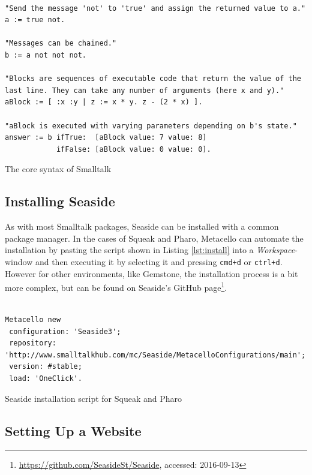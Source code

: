 \documentclass[a4paper,12pt,pagesize,headsepline,oribibl,titlepage]{scrartcl}
\begin{document}
\begin{listing}[]%
\begin{verbatim}

"Send the message 'not' to 'true' and assign the returned value to a."
a := true not.

"Messages can be chained."
b := a not not not.

"Blocks are sequences of executable code that return the value of the 
last line. They can take any number of arguments (here x and y)."
aBlock := [ :x :y | z := x * y. z - (2 * x) ].

"aBlock is executed with varying parameters depending on b's state."
answer := b ifTrue:  [aBlock value: 7 value: 8] 
            ifFalse: [aBlock value: 0 value: 0].

\end{verbatim}
\caption{The core syntax of Smalltalk}
\label{lst:smalltalksyntax}
\end{listing}

\subsection{Installing Seaside}

As with most Smalltalk packages, Seaside can be installed with a common package manager. In the cases of Squeak and Pharo, Metacello can automate the installation by pasting the script shown in Listing \ref{lst:install} into a \emph{Workspace}-window and then executing it by selecting it and pressing \texttt{cmd+d} or \texttt{ctrl+d}. However for other environments, like Gemstone, the installation process is a bit more complex, but can be found on Seaside's GitHub page\footnote{\url{https://github.com/SeasideSt/Seaside}, accessed: 2016-09-13}.

\begin{listing}[]%
\begin{verbatim}

Metacello new
 configuration: 'Seaside3';
 repository: 'http://www.smalltalkhub.com/mc/Seaside/MetacelloConfigurations/main';
 version: #stable;
 load: 'OneClick'.

\end{verbatim}
\caption{Seaside installation script for Squeak and Pharo}
\label{lst:install}
\end{listing}

\subsection{Setting Up a Website}
\end{document}
